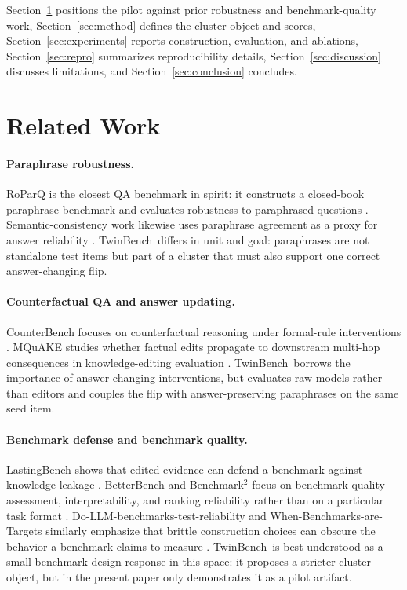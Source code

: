 \documentclass{article}
\newcommand{\tb}{TwinBench}
\begin{document}
Section~\ref{sec:related} positions the pilot against prior robustness and benchmark-quality work, Section~\ref{sec:method} defines the cluster object and scores, Section~\ref{sec:experiments} reports construction, evaluation, and ablations, Section~\ref{sec:repro} summarizes reproducibility details, Section~\ref{sec:discussion} discusses limitations, and Section~\ref{sec:conclusion} concludes.

\section{Related Work}
\label{sec:related}

\paragraph{Paraphrase robustness.}
RoParQ is the closest QA benchmark in spirit: it constructs a closed-book paraphrase benchmark and evaluates robustness to paraphrased questions \citep{choi2025roparqparaphraseawarealignmentlarge}. Semantic-consistency work likewise uses paraphrase agreement as a proxy for answer reliability \citep{rabinovich-etal-2023-predicting}. \tb\ differs in unit and goal: paraphrases are not standalone test items but part of a cluster that must also support one correct answer-changing flip.

\paragraph{Counterfactual QA and answer updating.}
CounterBench focuses on counterfactual reasoning under formal-rule interventions \citep{chen2025counterbench}. MQuAKE studies whether factual edits propagate to downstream multi-hop consequences in knowledge-editing evaluation \citep{zhong-etal-2023-mquake}. \tb\ borrows the importance of answer-changing interventions, but evaluates raw models rather than editors and couples the flip with answer-preserving paraphrases on the same seed item.

\paragraph{Benchmark defense and benchmark quality.}
LastingBench shows that edited evidence can defend a benchmark against knowledge leakage \citep{fang-etal-2025-lastingbench}. BetterBench and Benchmark$^2$ focus on benchmark quality assessment, interpretability, and ranking reliability rather than on a particular task format \citep{reuel2024betterbenchassessingaibenchmarks,qian2026benchmark2systematicevaluationllm}. Do-LLM-benchmarks-test-reliability and When-Benchmarks-are-Targets similarly emphasize that brittle construction choices can obscure the behavior a benchmark claims to measure \citep{vendrow2025largelanguagemodelbenchmarks,alzahrani2024benchmarkstargetsrevealingsensitivity}. \tb\ is best understood as a small benchmark-design response in this space: it proposes a stricter cluster object, but in the present paper only demonstrates it as a pilot artifact.
\end{document}
